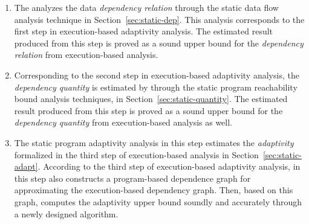 \begin{enumerate}
\item The {\THESYSTEM} analyzes the data \emph{dependency relation} through the static data flow analysis technique in Section~\ref{sec:static-dep}.
This analysis corresponds to the first step in execution-based adaptivity analysis. 
The estimated result produced from 
this step is proved as a sound upper bound for the \emph{dependency relation} from execution-based analysis.
\item 
Corresponding to the second step in execution-based adaptivity analysis, the \emph{dependency quantity} 
is estimated by {\THESYSTEM} through the static program reachability bound analysis techniques, in Section~\ref{sec:static-quantity}.
The estimated result produced from 
this step is proved as a sound upper bound for the \emph{dependency quantity} from execution-based analysis as well.
\item 
The static program adaptivity analysis in this step
estimates the \emph{adaptivity} formalized in the third step of execution-based analysis in Section~\ref{sec:static-adapt}.
According to the third step of execution-based adaptivity analysis, 
{\THESYSTEM} in this step also constructs a program-based dependence graph for approximating the execution-based dependency graph.
Then, based on this graph, {\THESYSTEM} 
computes the adaptivity upper bound soundly 
and accurately through a newly designed algorithm.
\end{enumerate}



